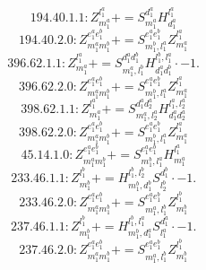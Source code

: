 \documentclass[letterpaper,10pt,fleqn,leqno,onecolumn]{article}
\begin{document}
\begin{equation} \;\;\;\;\;\;  194.40.1.1: Z^{l_{1}^{a}}_{m_{1}^{a}}+=S^{d_{1}^{a}}_{m_{1}^{a}}H^{l_{1}^{a}}_{d_{1}^{a}} \end{equation}
\begin{equation} \;\;\;\;\;\;  194.40.2.0: Z^{e_{1}^{a}e_{1}^{b}}_{m_{1}^{a}m_{1}^{b}}+=S^{e_{1}^{a}e_{1}^{b}}_{m_{1}^{b},l_{1}^{a}}Z^{l_{1}^{a}}_{m_{1}^{a}} \end{equation}
\begin{equation} \;\;\;\;\;\;  396.62.1.1: Z^{l_{1}^{a}}_{m_{1}^{a}}+=S^{d_{1}^{a}d_{1}^{b}}_{m_{1}^{a},l_{1}^{b}}H^{l_{1}^{b},l_{1}^{a}}_{d_{1}^{a}d_{1}^{b}}\cdot -1. \end{equation}
\begin{equation} \;\;\;\;\;\;  396.62.2.0: Z^{e_{1}^{a}e_{1}^{b}}_{m_{1}^{a}m_{1}^{b}}+=S^{e_{1}^{a}e_{1}^{b}}_{m_{1}^{b},l_{1}^{a}}Z^{l_{1}^{a}}_{m_{1}^{a}} \end{equation}
\begin{equation} \;\;\;\;\;\;  398.62.1.1: Z^{l_{1}^{a}}_{m_{1}^{a}}+=S^{d_{1}^{a}d_{2}^{a}}_{m_{1}^{a},l_{2}^{a}}H^{l_{1}^{a},l_{2}^{a}}_{d_{1}^{a}d_{2}^{a}} \end{equation}
\begin{equation} \;\;\;\;\;\;  398.62.2.0: Z^{e_{1}^{a}e_{1}^{b}}_{m_{1}^{a}m_{1}^{b}}+=S^{e_{1}^{a}e_{1}^{b}}_{m_{1}^{b},l_{1}^{a}}Z^{l_{1}^{a}}_{m_{1}^{a}} \end{equation}
\begin{equation} \;\;\;\;\;\;  45.14.1.0: Z^{e_{1}^{a}e_{1}^{b}}_{m_{1}^{a}m_{1}^{b}}+=S^{e_{1}^{a}e_{1}^{b}}_{m_{1}^{b},l_{1}^{a}}H^{l_{1}^{a}}_{m_{1}^{a}} \end{equation}
\begin{equation} \;\;\;\;\;\;  233.46.1.1: Z^{l_{1}^{b}}_{m_{1}^{b}}+=H^{l_{1}^{b},l_{2}^{b}}_{m_{1}^{b},d_{1}^{b}}S^{d_{1}^{b}}_{l_{2}^{b}}\cdot -1. \end{equation}
\begin{equation} \;\;\;\;\;\;  233.46.2.0: Z^{e_{1}^{a}e_{1}^{b}}_{m_{1}^{a}m_{1}^{b}}+=S^{e_{1}^{a}e_{1}^{b}}_{m_{1}^{a},l_{1}^{b}}Z^{l_{1}^{b}}_{m_{1}^{b}} \end{equation}
\begin{equation} \;\;\;\;\;\;  237.46.1.1: Z^{l_{1}^{b}}_{m_{1}^{b}}+=H^{l_{1}^{b},l_{1}^{a}}_{m_{1}^{b},d_{1}^{a}}S^{d_{1}^{a}}_{l_{1}^{a}}\cdot -1. \end{equation}
\begin{equation} \;\;\;\;\;\;  237.46.2.0: Z^{e_{1}^{a}e_{1}^{b}}_{m_{1}^{a}m_{1}^{b}}+=S^{e_{1}^{a}e_{1}^{b}}_{m_{1}^{a},l_{1}^{b}}Z^{l_{1}^{b}}_{m_{1}^{b}} \end{equation}
\end{document}
